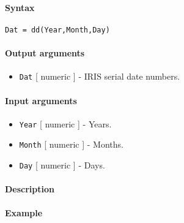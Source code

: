 


	\paragraph{Syntax}

\begin{verbatim}
Dat = dd(Year,Month,Day)
\end{verbatim}

\paragraph{Output arguments}

\begin{itemize}
\itemsep1pt\parskip0pt
\item
  \texttt{Dat} {[} numeric {]} - IRIS serial date numbers.
\end{itemize}

\paragraph{Input arguments}

\begin{itemize}
\item
  \texttt{Year} {[} numeric {]} - Years.
\item
  \texttt{Month} {[} numeric {]} - Months.
\item
  \texttt{Day} {[} numeric {]} - Days.
\end{itemize}

\paragraph{Description}

\paragraph{Example}



